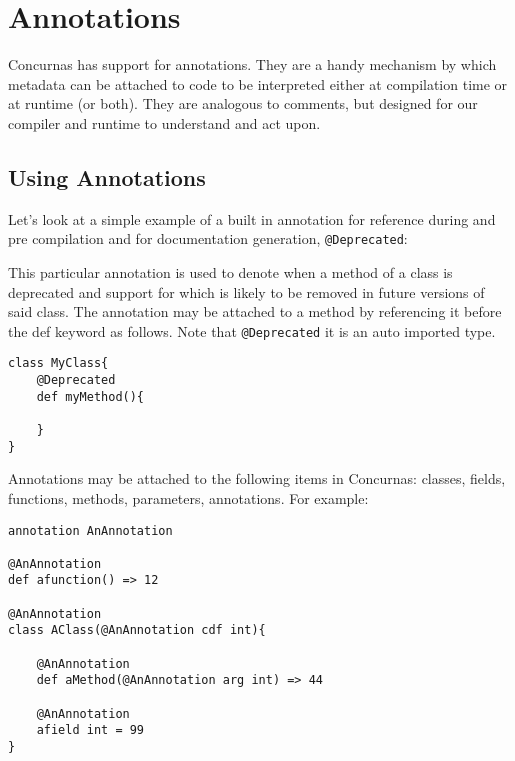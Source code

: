 \documentclass[conc-doc]{subfiles}
\begin{document}
	
	\chapter[Annotations]{Annotations}


Concurnas has support for annotations. They are a handy mechanism by which metadata can be attached to code to be interpreted either at compilation time or at runtime (or both). They are analogous to comments, but designed for our compiler and runtime to understand and act upon.


\section{Using Annotations}
Let's look at a simple example of a built in annotation for reference during and pre compilation and for documentation generation, \lstinline{@Deprecated}:

This particular annotation is used to denote when a method of a class is deprecated and support for which is likely to be removed in future versions of said class. The annotation may be attached to a method by referencing it before the def keyword as follows. Note that \lstinline{@Deprecated} it is an auto imported type.

\begin{lstlisting}
class MyClass{
	@Deprecated
	def myMethod(){
		
	}
}
\end{lstlisting}

Annotations may be attached to the following items in Concurnas: classes, fields, functions, methods, parameters, annotations. For example:

\begin{lstlisting}
annotation AnAnnotation

@AnAnnotation
def afunction() => 12

@AnAnnotation
class AClass(@AnAnnotation cdf int){
	
	@AnAnnotation
	def aMethod(@AnAnnotation arg int) => 44
	
	@AnAnnotation
	afield int = 99
}
\end{lstlisting}
\end{document}
